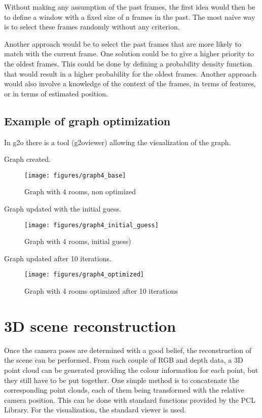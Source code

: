 Without making any assumption of the past frames, the first idea would then be to define a window with a fixed size of n frames in the past. The most naive way is to select these frames randomly without any criterion.

 Another approach would be to select the past frames that are more likely to match with the current frame. One solution could be to give a higher priority to the oldest frames. This could be done by defining a probability density function that would result in a higher probability for the oldest frames. Another approach would also involve a knowledge of the context of the frames, in terms of features, or in terms of estimated position.

\subsection{Example of graph optimization}
In g2o there is a tool (g2oviewer) allowing the visualization of the graph.

Graph created.
\begin{figure}[h]
\centering
\texttt{[image: figures/graph4\_base]}
\caption{Graph with 4 rooms, non optimized}
\end{figure}

Graph updated with the initial guess.
\begin{figure}[h]
\centering
\texttt{[image: figures/graph4\_initial\_guess]}
\caption{Graph with 4 rooms, initial guess)}
\end{figure}

Graph updated after 10 iterations.
\begin{figure}[h]
\centering
\texttt{[image: figures/graph4\_optimized]}
\caption{Graph with 4 rooms optimized after 10 iterations}
\end{figure}

\clearpage

\section{3D scene reconstruction}

Once the camera poses are determined with a good belief, the reconstruction of the scene can be performed. From each couple of RGB and depth data, a 3D point cloud can be generated providing the colour information for each point, but they still have to be put together. One simple method is to concatenate the corresponding point clouds, each of them being transformed with the relative camera position. This can be done with standard functions provided by the PCL Library. For the visualization, the standard viewer is used.

